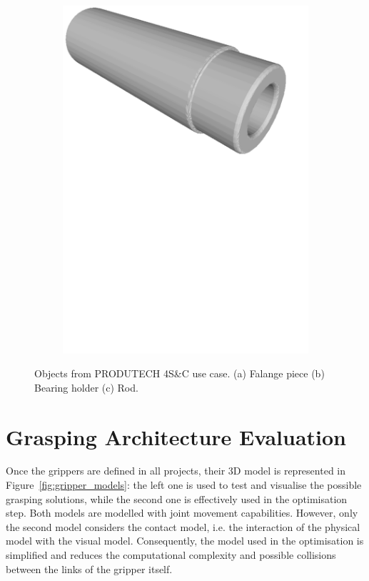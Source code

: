 \begin{figure}[h!]
{\begin{tcolorbox}
\begin{subfigure}[c]{.32\textwidth}
          \includegraphics[trim={0cm 17cm 0cm 0cm},clip,width=1\linewidth,angle=0]{Cap5/Figuras/objects/rod.pdf}
          \caption{}
          \label{fig:rod}
      \end{subfigure}
     \end{tcolorbox}
     \caption{Objects from PRODUTECH 4S\&C use case. (a) Falange piece (b) Bearing holder (c) Rod.}
     \label{fig:obj_produtech}
   }%
 \end{figure}


\section{Grasping Architecture Evaluation}
\label{cap5:grasping_planner_evaluation}


Once the grippers are defined in all projects, their 3D model is represented in Figure~\ref{fig:gripper_models}: the left one is used to test and visualise the possible grasping solutions, while the second one is effectively used in the optimisation step. Both models are modelled with joint movement capabilities. However, only the second model considers the contact model, i.e. the interaction of the physical model with the visual model. Consequently, the model used in the optimisation is simplified and reduces the computational complexity and possible collisions between the links of the gripper itself.

